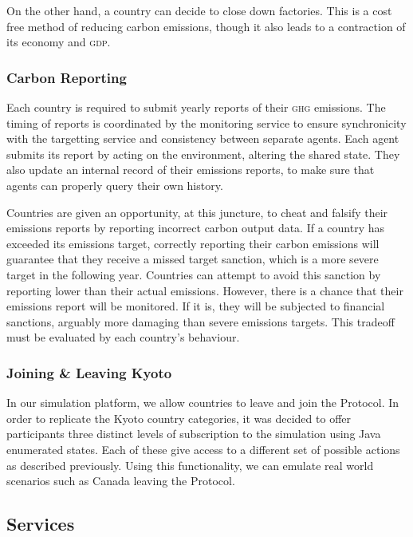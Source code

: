 On the other hand, a country can decide to close down factories. This is a cost free method of reducing carbon emissions, though it also leads to a contraction of its economy and \textsc{gdp}. 

\subsubsection{Carbon Reporting}

Each country is required to submit yearly reports of their \textsc{ghg} emissions. The timing of reports is coordinated by the monitoring service to ensure synchronicity with the targetting service and consistency between separate agents. Each agent submits its report by acting on the environment, altering the shared state. They also update an internal record of their emissions reports, to make sure that agents can properly query their own history.

Countries are given an opportunity, at this juncture, to cheat and falsify their emissions reports by reporting incorrect carbon output data. If a country has exceeded its emissions target, correctly reporting their carbon emissions will guarantee that they receive a missed target sanction, which is a more severe target in the following year. Countries can attempt to avoid this sanction by reporting lower than their actual emissions. However, there is a chance that their emissions report will be monitored. If it is, they will be subjected to financial sanctions, arguably more damaging than severe emissions targets. This tradeoff must be evaluated by each country's behaviour.

\subsubsection{Joining \& Leaving Kyoto}

In our simulation platform, we allow countries to leave and join the Protocol. In order to replicate the Kyoto country categories, it was decided to offer participants three distinct levels of subscription to the simulation using Java enumerated states. Each of these give access to a different set of possible actions as described previously. Using this functionality, we can emulate real world scenarios such as Canada leaving the Protocol.

\subsection{Services}

